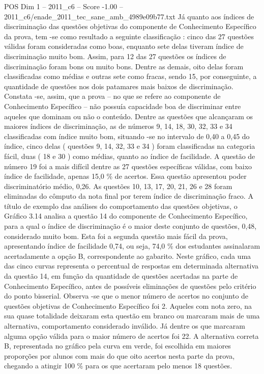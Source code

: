 \begin{textsample}{POS Dim 1 – 2011\_c6 – Score -1.00 – 2011\_c6/enade\_2011\_tec\_sane\_amb\_4989e09b77.txt}
Já quanto aos índices de discriminação das questões objetivas do componente de Conhecimento Específico da prova, tem -se como resultado a seguinte classificação : cinco das 27 questões válidas foram consideradas como boas, enquanto sete delas tiveram índice de discriminação muito bom.
Assim, para 12 das 27 questões os índices de discriminação foram bons ou muito bons.
Dentre as demais, oito delas foram classificadas como médias e outras sete como fracas, sendo 15, por conseguinte, a quantidade de questões nos dois patamares mais baixos de discriminação.
Constata -se, assim, que a prova – no que se refere ao componente de Conhecimento Específico – não possuía capacidade boa de discriminar entre aqueles que dominam ou não o conteúdo.
Dentre as questões que alcançaram os maiores índices de discriminação, as de números 9, 14, 18, 30, 32, 33 e 34 classificadas com índice muito bom, situando -se no intervalo de 0,40 a 0,45 do índice, cinco delas ( questões 9, 14, 32, 33 e 34 ) foram classificadas na categoria fácil, duas ( 18 e 30 ) como médias, quanto ao índice de facilidade.
A questão de número 19 foi a mais difícil dentre as 27 questões específicas válidas, com baixo índice de facilidade, apenas 15,0 \% de acertos.
Essa questão apresentou poder discriminatório médio, 0,26.
As questões 10, 13, 17, 20, 21, 26 e 28 foram eliminadas do cômputo da nota final por terem índice de discriminação fraco.
A título de exemplo das análises do comportamento das questões objetivas, o Gráfico 3.14 analisa a questão 14 do componente de Conhecimento Específico, para a qual o índice de discriminação é o maior deste conjunto de questões, 0,48, considerado muito bom.
Esta foi a segunda questão mais fácil da prova, apresentando índice de facilidade 0,74, ou seja, 74,0 \% dos estudantes assinalaram acertadamente a opção B, correspondente ao gabarito.
Neste gráfico, cada uma das cinco curvas representa o percentual de respostas em determinada alternativa da questão 14, em função da quantidade de questões acertadas na parte de Conhecimento Específico, antes de possíveis eliminações de questões pelo critério do ponto bisserial.
Observa -se que o menor número de acertos no conjunto de questões objetivas de Conhecimento Específico foi 2.
Aqueles com nota zero, na sua quase totalidade deixaram esta questão em branco ou marcaram mais de uma alternativa, comportamento considerado inválido.
Já dentre os que marcaram alguma opção válida para o maior número de acertos foi 22.
A alternativa correta B, representada no gráfico pela curva em verde, foi escolhida em maiores proporções por alunos com mais do que oito acertos nesta parte da prova, chegando a atingir 100 \% para os que acertaram pelo menos 18 questões.

\end{textsample}
